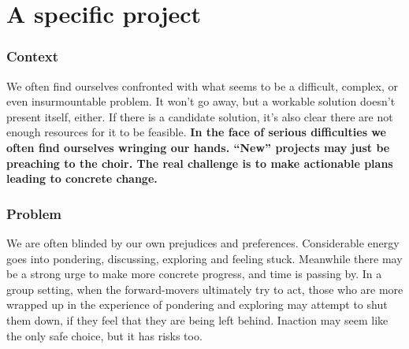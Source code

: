 \section{A specific project}\label{sec:A specific project}
\subsubsection*{Context}
We often find ourselves confronted with what seems to be a difficult, complex, or even insurmountable problem.  It won't go away, but a workable solution doesn't present itself, either.  If there is a candidate solution, it's also clear there are not enough resources for it to be feasible.
\textbf{In the face of serious difficulties we often find ourselves wringing our hands. ``New'' projects may just be preaching to the choir.  The real challenge is to make actionable plans leading to concrete change.}

\subsubsection*{Problem}
We are often blinded by our own prejudices and preferences.  Considerable energy goes into pondering, discussing, exploring and feeling stuck.  Meanwhile there may be a strong urge to make more concrete progress, and time is passing by.  In a group setting, when the forward-movers ultimately try to act, those who are more wrapped up in the experience of pondering and exploring may attempt to shut them down, if they feel that they are being left behind.  Inaction may seem like the only safe choice, but it has risks too.

